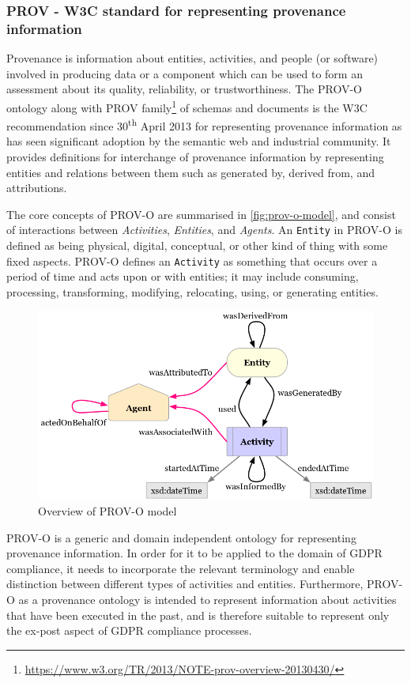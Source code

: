 \subsubsection{PROV - W3C standard for representing provenance information}
Provenance is information about entities, activities, and people (or software)
involved in producing data or a component which can be used to form an
assessment about its quality, reliability, or trustworthiness. The PROV-O ontology \cite{lebo_prov-o_2013} along with PROV family\footnote{\url{https://www.w3.org/TR/2013/NOTE-prov-overview-20130430/}} of schemas and documents is the W3C recommendation since 30\textsuperscript{th} April 2013 for representing provenance information as has seen significant adoption by the semantic web and industrial community.
It provides definitions for interchange of provenance information by representing entities
and relations between them such as generated by, derived from, and attributions.

The core concepts of PROV-O are summarised in \autoref{fig:prov-o-model}, and consist of interactions between \textit{Activities}, \textit{Entities}, and \textit{Agents}.
An \texttt{Entity} in PROV-O is defined as being physical, digital, conceptual, or other
kind of thing with some fixed aspects. PROV-O defines an \texttt{Activity} as something
that occurs over a period of time and acts upon or with entities; it may include
consuming, processing, transforming, modifying, relocating, using, or generating
entities.
\begin{figure}[htbp]
    \centering
    \includegraphics[width=0.8\linewidth]{img/prov-o-model.png}
    \caption{Overview of PROV-O model \cite{lebo_prov-o_2013}}
    \label{fig:prov-o-model}
\end{figure}

PROV-O is a generic and domain independent ontology for representing provenance information.
In order for it to be applied to the domain of GDPR compliance, it needs to incorporate the relevant terminology and enable distinction between different types of activities and entities.
Furthermore, PROV-O as a provenance ontology is intended to represent information about activities that have been executed in the past, and is therefore suitable to represent only the ex-post aspect of GDPR compliance processes.

